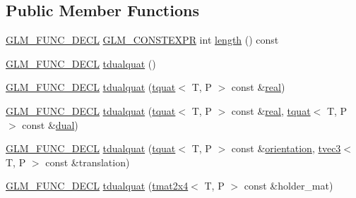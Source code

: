 \subsection*{Public Member Functions}
\begin{DoxyCompactItemize}
\item 
\hyperlink{setup_8hpp_ab2d052de21a70539923e9bcbf6e83a51}{G\+L\+M\+\_\+\+F\+U\+N\+C\+\_\+\+D\+E\+CL} \hyperlink{setup_8hpp_a08b807947b47031d3a511f03f89645ad}{G\+L\+M\+\_\+\+C\+O\+N\+S\+T\+E\+X\+PR} int \hyperlink{structglm_1_1detail_1_1tdualquat_a07e4d1cc692516c4cc15dd2e39ae3252}{length} () const
\item 
\hyperlink{setup_8hpp_ab2d052de21a70539923e9bcbf6e83a51}{G\+L\+M\+\_\+\+F\+U\+N\+C\+\_\+\+D\+E\+CL} \hyperlink{structglm_1_1detail_1_1tdualquat_ae52f08077fef0b65daffd98e128f3d18}{tdualquat} ()
\item 
\hyperlink{setup_8hpp_ab2d052de21a70539923e9bcbf6e83a51}{G\+L\+M\+\_\+\+F\+U\+N\+C\+\_\+\+D\+E\+CL} \hyperlink{structglm_1_1detail_1_1tdualquat_a4a3b8676710dc0dd69e03b7e5fa2fd46}{tdualquat} (\hyperlink{structglm_1_1detail_1_1tquat}{tquat}$<$ T, P $>$ const \&\hyperlink{structglm_1_1detail_1_1tdualquat_abebb177d1dca2b170fe7d01e9970eb37}{real})
\item 
\hyperlink{setup_8hpp_ab2d052de21a70539923e9bcbf6e83a51}{G\+L\+M\+\_\+\+F\+U\+N\+C\+\_\+\+D\+E\+CL} \hyperlink{structglm_1_1detail_1_1tdualquat_a3ba0cb0502e788715bd1b28547faaf78}{tdualquat} (\hyperlink{structglm_1_1detail_1_1tquat}{tquat}$<$ T, P $>$ const \&\hyperlink{structglm_1_1detail_1_1tdualquat_abebb177d1dca2b170fe7d01e9970eb37}{real}, \hyperlink{structglm_1_1detail_1_1tquat}{tquat}$<$ T, P $>$ const \&\hyperlink{structglm_1_1detail_1_1tdualquat_a6d739e4771a6244cc15562c2ecda7fdc}{dual})
\item 
\hyperlink{setup_8hpp_ab2d052de21a70539923e9bcbf6e83a51}{G\+L\+M\+\_\+\+F\+U\+N\+C\+\_\+\+D\+E\+CL} \hyperlink{structglm_1_1detail_1_1tdualquat_abf6379e6f03b8fd76ae490434893286a}{tdualquat} (\hyperlink{structglm_1_1detail_1_1tquat}{tquat}$<$ T, P $>$ const \&\hyperlink{group__gtx__rotate__vector_gac80aaf3b2af70c7f03f1077d4b6ac507}{orientation}, \hyperlink{structglm_1_1detail_1_1tvec3}{tvec3}$<$ T, P $>$ const \&translation)
\item 
\hyperlink{setup_8hpp_ab2d052de21a70539923e9bcbf6e83a51}{G\+L\+M\+\_\+\+F\+U\+N\+C\+\_\+\+D\+E\+CL} \hyperlink{structglm_1_1detail_1_1tdualquat_a07db5c65293e34b2d0e53c62940db0f8}{tdualquat} (\hyperlink{structglm_1_1detail_1_1tmat2x4}{tmat2x4}$<$ T, P $>$ const \&holder\+\_\+mat)
\item 

\end{DoxyCompactItemize}
